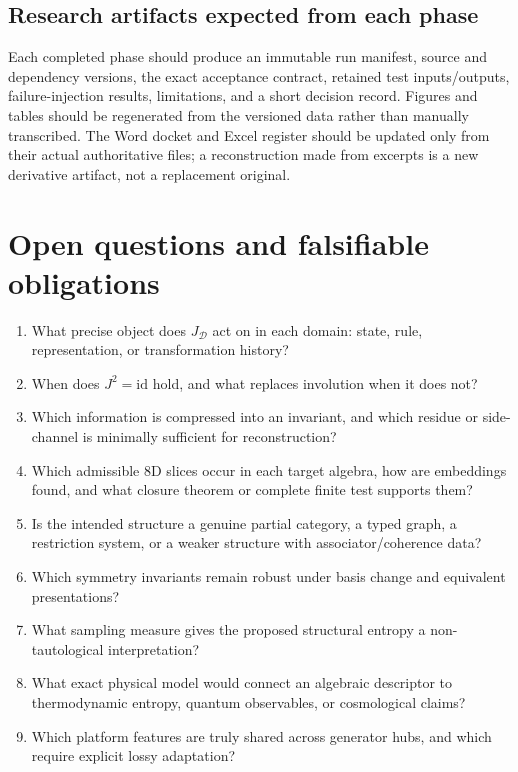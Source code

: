 \documentclass[11pt,oneside]{article}
\begin{document}
\subsection{Research artifacts expected from each phase}
Each completed phase should produce an immutable run manifest, source and dependency versions, the exact acceptance contract, retained test inputs/outputs, failure-injection results, limitations, and a short decision record. Figures and tables should be regenerated from the versioned data rather than manually transcribed. The Word docket and Excel register should be updated only from their actual authoritative files; a reconstruction made from excerpts is a new derivative artifact, not a replacement original.

\section{Open questions and falsifiable obligations}
\begin{enumerate}
  \item What precise object does $J_{\mathcal D}$ act on in each domain: state, rule, representation, or transformation history?
  \item When does $J^2=\mathrm{id}$ hold, and what replaces involution when it does not?
  \item Which information is compressed into an invariant, and which residue or side-channel is minimally sufficient for reconstruction?
  \item Which admissible 8D slices occur in each target algebra, how are embeddings found, and what closure theorem or complete finite test supports them?
  \item Is the intended structure a genuine partial category, a typed graph, a restriction system, or a weaker structure with associator/coherence data?
  \item Which symmetry invariants remain robust under basis change and equivalent presentations?
  \item What sampling measure gives the proposed structural entropy a non-tautological interpretation?
  \item What exact physical model would connect an algebraic descriptor to thermodynamic entropy, quantum observables, or cosmological claims?
  \item Which platform features are truly shared across generator hubs, and which require explicit lossy adaptation?
\end{enumerate}
\end{document}
